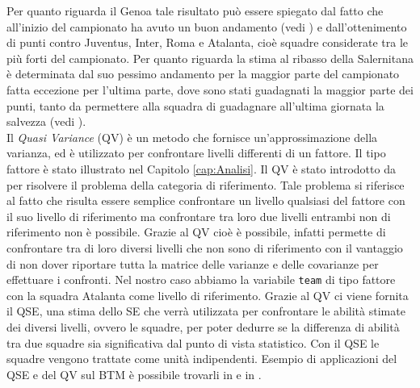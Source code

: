 \begin{comment}
		\end{tabular} \hbox{}
		
		\caption{Per ogni squadra viene riportata l'abilità stimata, lo \emph{Standard 
				Error} (SE), il \emph{Quasi Standard Error} (QSE) e il \emph{Quasi Variance} (QV). Nella tabella viene indicato con un asterisco le squadre con un piazzamento stimato diverso da quello reale.} \label{tab:BTH}
	\end{table}
\end{comment}

Per quanto riguarda il Genoa tale risultato può essere spiegato dal fatto che all'inizio del campionato ha avuto un buon andamento (vedi \textit{\cite{storyGenoa}}) e dall'ottenimento di punti contro Juventus, Inter, Roma e Atalanta, cioè squadre considerate tra le più forti del campionato. Per quanto riguarda la stima al ribasso della Salernitana è determinata dal suo pessimo andamento per la maggior parte del campionato fatta eccezione per l'ultima parte, dove sono stati guadagnati la maggior parte dei punti, tanto da permettere alla squadra di guadagnare all'ultima giornata la salvezza (vedi \textit{\cite{storySal}}). \\
Il \emph{Quasi Variance} (QV)\autocite{firth2004quasi} è un metodo che fornisce un'approssimazione della varianza, ed è utilizzato per confrontare livelli differenti di un fattore. Il tipo fattore è stato illustrato nel Capitolo \ref{cap:Analisi}. Il QV è stato introdotto da \textcite{firth2004quasi} per risolvere il problema della categoria di riferimento. Tale problema si riferisce al fatto che risulta essere semplice confrontare un livello qualsiasi del fattore con il suo livello di riferimento ma confrontare tra loro due livelli entrambi non di riferimento non è possibile. Grazie al QV cioè è possibile, infatti permette di confrontare tra di loro diversi livelli che non sono di riferimento con il vantaggio di non dover riportare tutta la matrice delle varianze e delle covarianze per effettuare i confronti. Nel nostro caso abbiamo la variabile \texttt{team} di tipo fattore con la squadra Atalanta come livello di riferimento. Grazie al QV ci viene fornita il QSE, una stima dello SE che verrà utilizzata per confrontare le abilità stimate dei diversi livelli, ovvero le squadre, per poter dedurre se la differenza di abilità tra due squadre sia significativa dal punto di vista statistico. Con il QSE le squadre vengono trattate come unità indipendenti. Esempio di applicazioni del QSE e del QV sul BTM è possibile trovarli in \textcite{firth2004quasi} e in \textcite{turner2012bradley}.\\
